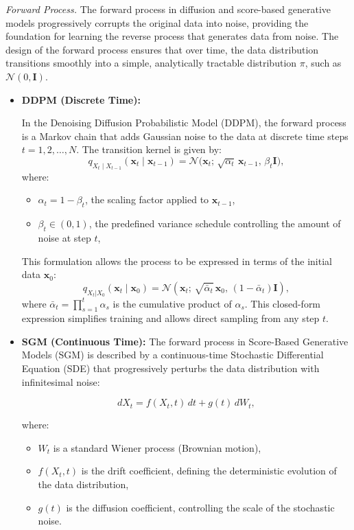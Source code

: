     


    
\textit{Forward Process.} The forward process in diffusion and score-based generative models progressively corrupts the original data into noise, providing the foundation for learning the reverse process that generates data from noise. The design of the forward process ensures that over time, the data distribution transitions smoothly into a simple, analytically tractable distribution $\pi$, such as \( \mathcal{N}(0, \mathbf{I}) \).

\begin{itemize}
    \item \textbf{DDPM (Discrete Time):}
    
    In the Denoising Diffusion Probabilistic Model (DDPM), the forward process is a Markov chain that adds Gaussian noise to the data at discrete time steps \( t = 1, 2, \dots, N \). The transition kernel is given by:
    \[
    q_{X_t \mid X_{t-1}}(\mathbf{x}_t \mid \mathbf{x}_{t-1}) = \mathcal{N}\bigl(\mathbf{x}_t;\, \sqrt{\alpha_t} \, \mathbf{x}_{t-1},\, \beta_t \mathbf{I}\bigr),
    \]
    where:
    \begin{itemize}
        \item \( \alpha_t = 1 - \beta_t \), the scaling factor applied to \( \mathbf{x}_{t-1} \),
        \item \( \beta_t \in (0, 1) \), the predefined variance schedule controlling the amount of noise at step \( t \),
    \end{itemize}
    This formulation allows the process to be expressed in terms of the initial data \( \mathbf{x}_0 \):
    \[
    q_{X_t|X_0}(\mathbf{x}_t \mid \mathbf{x}_0) = \mathcal{N}\left(\mathbf{x}_t;\, \sqrt{\bar{\alpha}_t} \, \mathbf{x}_0,\, (1 - \bar{\alpha}_t) \mathbf{I}\right),
    \]
    where \( \bar{\alpha}_t = \prod_{s=1}^t \alpha_s \) is the cumulative product of \( \alpha_s \). This closed-form expression simplifies training and allows direct sampling from any step \( t \).

    \item \textbf{SGM (Continuous Time):} The forward process in Score-Based Generative Models (SGM) is described by a continuous-time Stochastic Differential Equation (SDE) that progressively perturbs the data distribution with infinitesimal noise:

\[
dX_t = f(X_t, t) \, dt + g(t) \, dW_t,
\]

where:
\begin{itemize}
    \item \( W_t \) is a standard Wiener process (Brownian motion),
    \item \( f(X_t, t) \) is the drift coefficient, defining the deterministic evolution of the data distribution,
    \item \( g(t) \) is the diffusion coefficient, controlling the scale of the stochastic noise.
\end{itemize}


\end{itemize}
